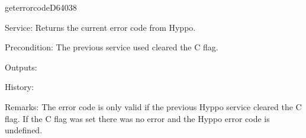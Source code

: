 \begin{hyppotrap}{geterrorcode}{D640}{38}
\item [Service:]
  Returns the current error code from Hyppo.
\item [Precondition:]
  The previous service used cleared the C flag.
\item [Outputs:]
\item [History:]
\item [Remarks:]
  The error code is only valid if the previous Hyppo service cleared the C flag.
  If the C flag was set there was no error and the Hyppo error code is
  undefined.


\end{hyppotrap}

